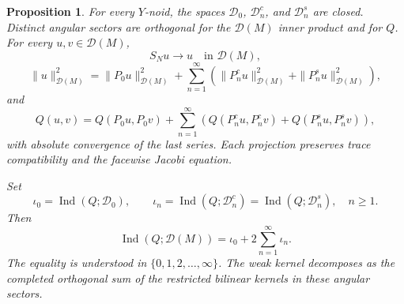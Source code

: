 \documentclass[11pt,twoside]{amsart}
\newtheorem{prop}[thm]{Proposition}
\numberwithin{equation}{section}
\begin{document}
\begin{prop}\label{prop: second assumption steklov}
For every $Y$-noid, the spaces $\mathcal D_0$, $\mathcal D_n^c$, and $\mathcal D_n^s$ are closed. Distinct angular sectors are orthogonal for the $\mathcal D(M)$ inner product and for $Q$. For every $u,v\in\mathcal D(M)$,
\[
S_Nu\longrightarrow u\quad\text{in }\mathcal D(M),
\]
\[
\|u\|_{\mathcal D(M)}^2
=\|P_0u\|_{\mathcal D(M)}^2
+\sum_{n=1}^\infty\left(\|P_n^cu\|_{\mathcal D(M)}^2+\|P_n^su\|_{\mathcal D(M)}^2\right),
\]
and
\[
Q(u,v)=Q(P_0u,P_0v)
+\sum_{n=1}^\infty\left(Q(P_n^cu,P_n^cv)+Q(P_n^su,P_n^sv)\right),
\]
with absolute convergence of the last series. Each projection preserves trace compatibility and the facewise Jacobi equation.

Set
\[
\iota_0=\operatorname{Ind}(Q;\mathcal D_0),
\qquad
\iota_n=\operatorname{Ind}(Q;\mathcal D_n^c)=\operatorname{Ind}(Q;\mathcal D_n^s),\quad n\ge1.
\]
Then
\[
\operatorname{Ind}(Q;\mathcal D(M))
=\iota_0+2\sum_{n=1}^\infty\iota_n.
\]
The equality is understood in $\{0,1,2,\ldots,\infty\}$. The weak kernel decomposes as the completed orthogonal sum of the restricted bilinear kernels in these angular sectors.
\end{prop}
\end{document}
